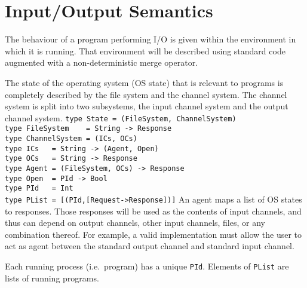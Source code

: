 %
%
\section{Input/Output Semantics}
\label{io-semantics}

The behaviour of a \Haskell{} program performing I/O is given within
the environment in which it is running.  That environment will be described
using standard \Haskell{} code augmented with a non-deterministic
merge operator.

The state of the operating system (OS state) that is relevant to
\Haskell{} programs is completely described by the file system and the
channel system.  The channel system is split into two subsystems, the
input channel system and the output channel system.
\bprog
\mbox{\tt type\ State\ =\ (FileSystem,\ ChannelSystem)}\\
\mbox{\tt type\ FileSystem\ \ \ \ =\ String\ ->\ Response}\\
\mbox{\tt type\ ChannelSystem\ =\ (ICs,\ OCs)}\\
\mbox{\tt type\ ICs\ \ \ =\ String\ ->\ (Agent,\ Open)}\\
\mbox{\tt type\ OCs\ \ \ =\ String\ ->\ Response}\\
\mbox{\tt type\ Agent\ =\ (FileSystem,\ OCs)\ ->\ Response}\\
\mbox{\tt type\ Open\ \ =\ PId\ ->\ Bool}\\
\mbox{\tt type\ PId\ \ \ =\ Int}\\
\mbox{\tt type\ PList\ =\ [(PId,[Request->Response])]}
\eprog
An agent maps a list of OS states to responses.  Those
responses will be used as the contents of input channels, and
thus can depend on output channels, other input channels, files, or
any combination thereof.  For example, a valid implementation must
allow the user to act as agent between the standard output
channel and standard input channel.

Each running process (i.e.~program) has a unique \mbox{\tt PId}.
Elements of \mbox{\tt PList} are lists of running programs.

